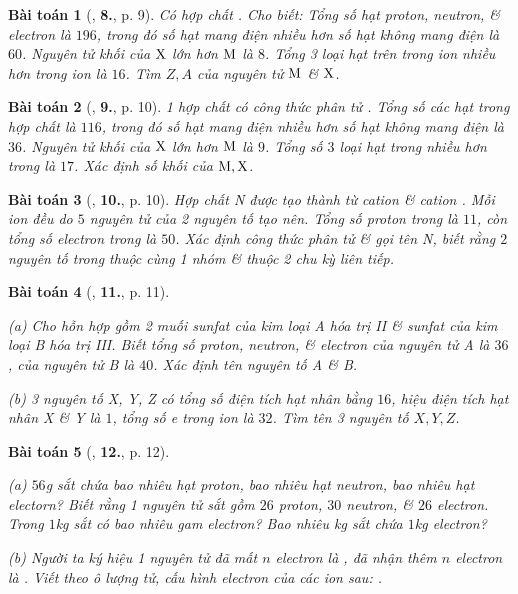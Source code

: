 \documentclass{article}
\numberwithin{equation}{section}
\newtheorem{baitoan}{Bài toán}[section]
\begin{document}
\begin{baitoan}[\cite{An2012}, \textbf{8.}, p. 9]
	Có hợp chất \emph{}. Cho biết: Tổng số hạt proton, neutron, \& electron là $196$, trong đó số hạt mang điện nhiều hơn số hạt không mang điện là $60$. Nguyên tử khối của $\rm X$ lớn hơn $\rm M$ là $8$. Tổng 3 loại hạt trên trong ion \emph{} nhiều hơn trong ion \emph{} là $16$. Tìm $Z,A$ của nguyên tử $\rm M$ \& $\rm X$.
\end{baitoan}

\begin{baitoan}[\cite{An2012}, \textbf{9.}, p. 10]
	1 hợp chất có công thức phân tử \emph{}. Tổng số các hạt trong hợp chất là $116$, trong đó số hạt mang điện nhiều hơn số hạt không mang điện là $36$. Nguyên tử khối của $\rm X$ lớn hơn $\rm M$ là $9$. Tổng số $3$ loại hạt trong \emph{} nhiều hơn trong \emph{} là $17$. Xác định số khối của $\rm M,X$.
\end{baitoan}

\begin{baitoan}[\cite{An2012}, \textbf{10.}, p. 10]
	Hợp chất N được tạo thành từ cation \emph{} \& cation \emph{}. Mỗi ion đều do $5$ nguyên tử của 2 nguyên tố tạo nên. Tổng số proton trong \emph{} là $11$, còn tổng số electron trong \emph{} là $50$. Xác định công thức phân tử \& gọi tên N, biết rằng $2$ nguyên tố trong \emph{} thuộc cùng 1 nhóm \& thuộc 2 chu kỳ liên tiếp.
\end{baitoan}

\begin{baitoan}[\cite{An2012}, \textbf{11.}, p. 11]
	\begin{enumerate*}
		\item[(a)] Cho hỗn hợp gồm 2 muối sunfat của kim loại A hóa trị II \& sunfat của kim loại B hóa trị III. Biết tổng số proton, neutron, \& electron của nguyên tử A là $36$, của nguyên tử B là $40$. Xác định tên nguyên tố A \& B.
		\item[(b)] 3 nguyên tố X, Y, Z có tổng số điện tích hạt nhân bằng $16$, hiệu điện tích hạt nhân X \& Y là $1$, tổng số e trong ion \emph{\ce{[X3Y]^-}} là $32$. Tìm tên 3 nguyên tố $X,Y,Z$.
	\end{enumerate*}
\end{baitoan}

\begin{baitoan}[\cite{An2012}, \textbf{12.}, p. 12]
	\begin{enumerate*}
		\item[(a)] $56$\emph{g} sắt chứa bao nhiêu hạt proton, bao nhiêu hạt neutron, bao nhiêu hạt electorn? Biết rằng 1 nguyên tử sắt gồm $26$ proton, $30$ neutron, \& $26$ electron. Trong $1$\emph{kg} sắt có bao nhiêu gam electron? Bao nhiêu \emph{kg} sắt chứa $1$\emph{kg} electron?
		\item[(b)] Người ta ký hiệu 1 nguyên tử đã mất $n$ electron là \emph{}, đã nhận thêm $n$ electron là \emph{}. Viết theo ô lượng tử, cấu hình electron của các ion sau: \emph{\ce{_11Na+,_13Al^{3+},_17Cl^-,_12Mg^{2+},_14Si^{4+},_8O^2}}.
	\end{enumerate*}
\end{baitoan}
\end{document}
